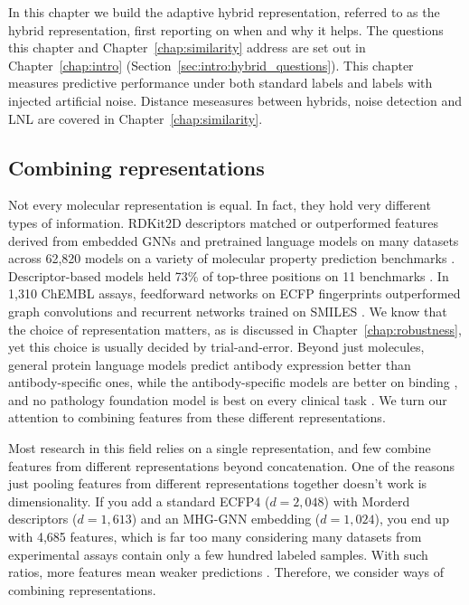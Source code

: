 In this chapter we build the adaptive hybrid representation, referred to as the hybrid representation, first reporting on when and why it helps. The questions this chapter and Chapter~\ref{chap:similarity} address are set out in Chapter~\ref{chap:intro} (Section~\ref{sec:intro:hybrid_questions}). This chapter measures predictive performance under both standard labels and labels with injected artificial noise. Distance meseasures between hybrids, noise detection and LNL are covered in Chapter~\ref{chap:similarity}.


\subsection{Combining representations}

Not every molecular representation is equal. In fact, they hold very different types of information. RDKit2D descriptors matched or outperformed features derived from embedded GNNs and pretrained language models on many datasets across 62,820 models on a variety of molecular property prediction benchmarks \citep{Deng2023}. Descriptor-based models held 73\% of top-three positions on 11 benchmarks \citep{Jiang2021}. In 1,310 ChEMBL assays, feedforward networks on ECFP fingerprints outperformed graph convolutions and recurrent networks trained on SMILES \citep{Mayr2018}. We know that the choice of representation matters, as is discussed in Chapter~\ref{chap:robustness}, yet this choice is usually decided by trial-and-error. Beyond just molecules, general protein language models predict antibody expression better than antibody-specific ones, while the antibody-specific models are better on binding \citep{Kenlay2024}, and no pathology foundation model is best on every clinical task \citep{ElNahhas2025}. We turn our attention to combining features from these different representations. 

Most research in this field relies on a single representation, and few combine features from different representations beyond concatenation. One of the reasons just pooling features from different representations together doesn't work is dimensionality. If you add a standard ECFP4 ($d=2,048$) with Morderd descriptors ($d=1,613$) and an MHG-GNN embedding ($d=1,024$), you end up with 4,685 features, which is far too many considering many datasets from experimental assays contain only a few hundred labeled samples. With such ratios, more features mean weaker predictions \citep{Hughes1968, Bellman1961}. Therefore, we consider ways of combining representations. 

